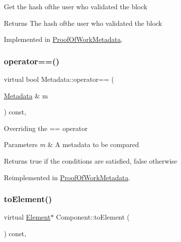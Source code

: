 Get the hash ofthe user who validated the block

\begin{DoxyReturn}{Returns}
The hash ofthe user who validated the block 
\end{DoxyReturn}


Implemented in \mbox{\hyperlink{classProofOfWorkMetadata_af29f8f40d4b438eaa9434b51c1aff7c6}{Proof\+Of\+Work\+Metadata}}.

\mbox{\label{classMetadata_a2721356452a5d366d58275dd1fc1209c}} 
\subsubsection{\texorpdfstring{operator==()}{operator==()}}
{\footnotesize\ttfamily virtual bool Metadata\+::operator== (\begin{DoxyParamCaption}\item[{\mbox{\hyperlink{classMetadata}{Metadata}} \&}]{m }\end{DoxyParamCaption}) const\hspace{0.3cm}{\ttfamily [inline]}, {\ttfamily [virtual]}}

Overriding the == operator


\begin{DoxyParams}{Parameters}
{\em m} & A metadata to be compared \\
\hline
\end{DoxyParams}
\begin{DoxyReturn}{Returns}
true if the conditions are satisfied, false otherwise 
\end{DoxyReturn}


Reimplemented in \mbox{\hyperlink{classProofOfWorkMetadata_ae490506a28967c7180163fc156dd5d51}{Proof\+Of\+Work\+Metadata}}.

\mbox{\label{classComponent_a3e63d8c993e417a4af3f56d65ebfc7ea}} 
\subsubsection{\texorpdfstring{to\+Element()}{toElement()}}
{\footnotesize\ttfamily virtual \mbox{\hyperlink{classElement}{Element}}$\ast$ Component\+::to\+Element (\begin{DoxyParamCaption}{ }\end{DoxyParamCaption}) const\hspace{0.3cm}{\ttfamily [pure virtual]}, {\ttfamily [inherited]}}

